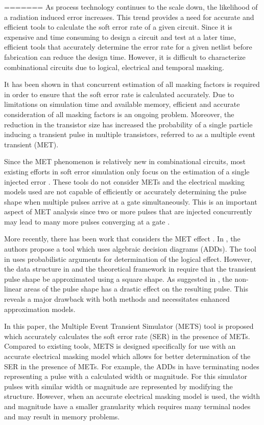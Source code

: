 \documentclass[conference]{IEEEtran}
\begin{document}
=======
As process technology continues to the scale down, the likelihood of a radiation induced error increases. This trend provides a need for accurate and efficient tools to calculate the soft error rate of a given circuit. Since it is expensive and time consuming to design a circuit and test at a later time, efficient tools that accurately determine the error rate for a given netlist before fabrication can reduce the design time. However, it is difficult to characterize combinational circuits due to logical, electrical and temporal masking.

It has been shown in \cite{MARS_C,METSys} that concurrent estimation of all masking factors is required in order to ensure that the soft error rate is calculated accurately. Due to limitations on simulation time and available memory, efficient and accurate consideration of all masking factors is an ongoing problem. Moreover, the reduction in the transistor size has increased the probability of a single particle inducing a transient pulse in multiple transistors, referred to as a multiple event transient (MET).

Since the MET phenomenon is relatively new in combinational circuits, most existing efforts in soft error simulation only focus on the estimation of a single injected error \cite{Accurate_Masking,MARS_C}. These tools do not consider METs and the electrical masking models used are not capable of efficiently or accurately determining the pulse shape when multiple pulses arrive at a gate simultaneously. This is an important aspect of MET analysis since two or more pulses that are injected concurrently may lead to many more pulses converging at a gate . 

More recently, there has been work that considers the MET effect \cite{METSys,Gangadhar2011}. In \cite{METSys}, the authors propose a tool which uses algebraic decision diagrams (ADDs). The tool in \cite{Gangadhar2011} uses probabilistic arguments for determination of the logical effect. However, the data structure in \cite{METSys} and the theoretical framework in \cite{Gangadhar2011} require that the transient pulse shape be approximated using a square shape. As suggested in \cite{Accurate_Masking,Watkins2016}, the non-linear areas of the pulse shape has a drastic effect on the resulting pulse. This reveals a major drawback with both methods and necessitates enhanced approximation models. 

In this paper, the Multiple Event Transient Simulator (METS) tool is proposed which accurately calculates the soft error rate (SER) in the presence of METs. Compared to existing tools, METS is designed specifically for use with an accurate electrical masking model which allows for better determination of the SER in the presence of METs. For example, the ADDs in \cite{METSys} have terminating nodes representing a pulse with a calculated width or magnitude. For this simulator pulses with similar width or magnitude are represented by modifying the structure. However, when an accurate electrical masking model is used, the width and magnitude have a smaller granularity which requires many terminal nodes and may result in memory problems.
\end{document}
